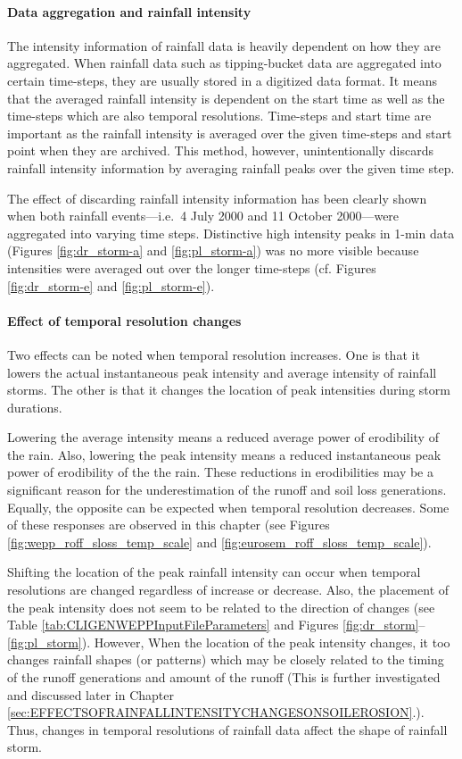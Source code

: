 \paragraph{Data aggregation and rainfall intensity} The intensity information
of rainfall data is heavily dependent on how they are aggregated. When rainfall
data such as tipping-bucket data are aggregated into certain time-steps, they
are usually stored in a digitized data format. It means that the averaged
rainfall intensity is dependent on the start time as well as the time-steps
which are also temporal resolutions. Time-steps and start time are important as
the rainfall intensity is averaged over the given time-steps and start point
when they are archived. This method, however, unintentionally discards rainfall
intensity information by averaging rainfall peaks over the given time step.

The effect of discarding rainfall intensity information has been clearly shown
when both rainfall events---i.e.\ 4 July 2000 and 11 October 2000---were
aggregated into varying time steps. Distinctive high intensity peaks in 1-min
data (Figures \ref{fig:dr_storm-a} and \ref{fig:pl_storm-a}) was no more visible
because intensities were averaged out over the longer time-steps (cf. Figures
\ref{fig:dr_storm-e} and \ref{fig:pl_storm-e}).

\paragraph{Effect of temporal resolution changes} Two effects can be noted when
temporal resolution increases. One is that it lowers the actual instantaneous
peak intensity and average intensity of rainfall storms. The other is that it
changes the location of peak intensities during storm durations.

Lowering the average intensity means a reduced average power of erodibility
of the rain. Also, lowering the peak intensity means a reduced instantaneous
peak power of erodibility of the the rain. These reductions in erodibilities may
be a significant reason for the underestimation of the runoff and soil loss
generations. Equally, the opposite can be expected when temporal resolution
decreases. Some of these responses are observed in this chapter (see Figures
\ref{fig:wepp_roff_sloss_temp_scale} and
\ref{fig:eurosem_roff_sloss_temp_scale}).

Shifting the location of the peak rainfall intensity can occur when temporal
resolutions are changed regardless of increase or decrease. Also, the placement
of the peak intensity does not seem to be related to the direction of changes
(see Table \ref{tab:CLIGENWEPPInputFileParameters} and Figures
\ref{fig:dr_storm}--\ref{fig:pl_storm}). However, When the location of the peak
intensity changes, it too changes rainfall shapes (or patterns) which may be
closely related to the timing of the runoff generations and amount of the runoff
(This is further investigated and discussed later in Chapter
\ref{sec:EFFECTSOFRAINFALLINTENSITYCHANGESONSOILEROSION}.). Thus, changes in
temporal resolutions of rainfall data affect the shape of rainfall storm.

